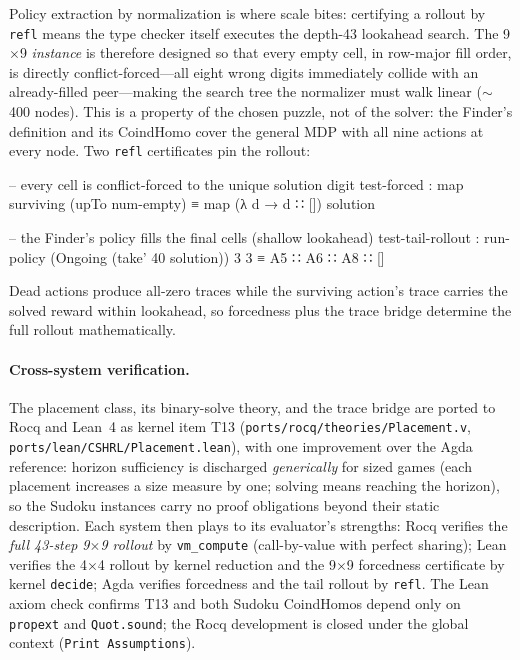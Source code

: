 \documentclass[9pt,a4paper]{article}
\newcommand{\fpath}[1]{\nolinkurl{#1}}
\theoremstyle{plain}
\theoremstyle{definition}
\theoremstyle{remark}
\begin{document}
Policy extraction by normalization is where scale bites: certifying a rollout by \texttt{refl} means the type checker itself executes the depth-43 lookahead search.  The 9$\times$9 \emph{instance} is therefore designed so that every empty cell, in row-major fill order, is directly conflict-forced---all eight wrong digits immediately collide with an already-filled peer---making the search tree the normalizer must walk linear ($\sim$400 nodes).  This is a property of the chosen puzzle, not of the solver: the Finder's definition and its CoindHomo cover the general MDP with all nine actions at every node.  Two \texttt{refl} certificates pin the rollout:
\begin{spec}
-- every cell is conflict-forced to the unique solution digit
test-forced : map surviving (upTo num-empty) ≡ map (λ d → d ∷ []) solution

-- the Finder's policy fills the final cells (shallow lookahead)
test-tail-rollout :
  run-policy (Ongoing (take' 40 solution)) 3 3 ≡ A5 ∷ A6 ∷ A8 ∷ []
\end{spec}
Dead actions produce all-zero traces while the surviving action's trace carries the solved reward within lookahead, so forcedness plus the trace bridge determine the full rollout mathematically.

\paragraph{Cross-system verification.}  The placement class, its binary-solve theory, and the trace bridge are ported to Rocq and Lean~4 as kernel item T13 (\fpath{ports/rocq/theories/Placement.v}, \fpath{ports/lean/CSHRL/Placement.lean}), with one improvement over the Agda reference: horizon sufficiency is discharged \emph{generically} for sized games (each placement increases a size measure by one; solving means reaching the horizon), so the Sudoku instances carry no proof obligations beyond their static description.  Each system then plays to its evaluator's strengths: Rocq verifies the \emph{full 43-step 9$\times$9 rollout} by \texttt{vm\_compute} (call-by-value with perfect sharing); Lean verifies the 4$\times$4 rollout by kernel reduction and the 9$\times$9 forcedness certificate by kernel \texttt{decide}; Agda verifies forcedness and the tail rollout by \texttt{refl}.  The Lean axiom check confirms T13 and both Sudoku CoindHomos depend only on \texttt{propext} and \texttt{Quot.sound}; the Rocq development is closed under the global context (\texttt{Print Assumptions}).
\end{document}
